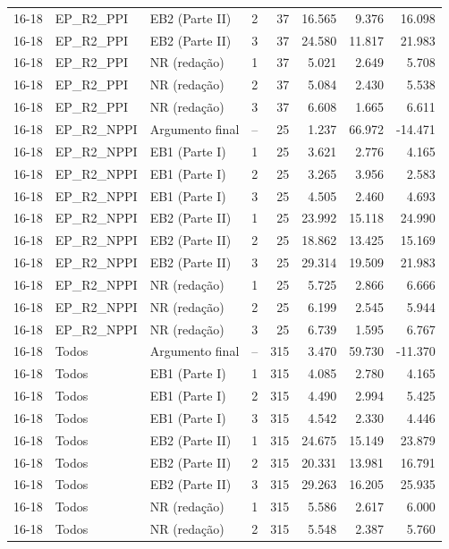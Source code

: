 \begin{longtable}{lllcrrrr}
16-18 & EP\_R2\_PPI & EB2 (Parte II) & 2 & 37 & 16.565 & 9.376 & 16.098 \\
16-18 & EP\_R2\_PPI & EB2 (Parte II) & 3 & 37 & 24.580 & 11.817 & 21.983 \\
16-18 & EP\_R2\_PPI & NR (redação) & 1 & 37 & 5.021 & 2.649 & 5.708 \\
16-18 & EP\_R2\_PPI & NR (redação) & 2 & 37 & 5.084 & 2.430 & 5.538 \\
16-18 & EP\_R2\_PPI & NR (redação) & 3 & 37 & 6.608 & 1.665 & 6.611 \\
16-18 & EP\_R2\_NPPI & Argumento final & -- & 25 & 1.237 & 66.972 & -14.471 \\
16-18 & EP\_R2\_NPPI & EB1 (Parte I) & 1 & 25 & 3.621 & 2.776 & 4.165 \\
16-18 & EP\_R2\_NPPI & EB1 (Parte I) & 2 & 25 & 3.265 & 3.956 & 2.583 \\
16-18 & EP\_R2\_NPPI & EB1 (Parte I) & 3 & 25 & 4.505 & 2.460 & 4.693 \\
16-18 & EP\_R2\_NPPI & EB2 (Parte II) & 1 & 25 & 23.992 & 15.118 & 24.990 \\
16-18 & EP\_R2\_NPPI & EB2 (Parte II) & 2 & 25 & 18.862 & 13.425 & 15.169 \\
16-18 & EP\_R2\_NPPI & EB2 (Parte II) & 3 & 25 & 29.314 & 19.509 & 21.983 \\
16-18 & EP\_R2\_NPPI & NR (redação) & 1 & 25 & 5.725 & 2.866 & 6.666 \\
16-18 & EP\_R2\_NPPI & NR (redação) & 2 & 25 & 6.199 & 2.545 & 5.944 \\
16-18 & EP\_R2\_NPPI & NR (redação) & 3 & 25 & 6.739 & 1.595 & 6.767 \\
16-18 & Todos & Argumento final & -- & 315 & 3.470 & 59.730 & -11.370 \\
16-18 & Todos & EB1 (Parte I) & 1 & 315 & 4.085 & 2.780 & 4.165 \\
16-18 & Todos & EB1 (Parte I) & 2 & 315 & 4.490 & 2.994 & 5.425 \\
16-18 & Todos & EB1 (Parte I) & 3 & 315 & 4.542 & 2.330 & 4.446 \\
16-18 & Todos & EB2 (Parte II) & 1 & 315 & 24.675 & 15.149 & 23.879 \\
16-18 & Todos & EB2 (Parte II) & 2 & 315 & 20.331 & 13.981 & 16.791 \\
16-18 & Todos & EB2 (Parte II) & 3 & 315 & 29.263 & 16.205 & 25.935 \\
16-18 & Todos & NR (redação) & 1 & 315 & 5.586 & 2.617 & 6.000 \\
16-18 & Todos & NR (redação) & 2 & 315 & 5.548 & 2.387 & 5.760 \\

\end{longtable}
